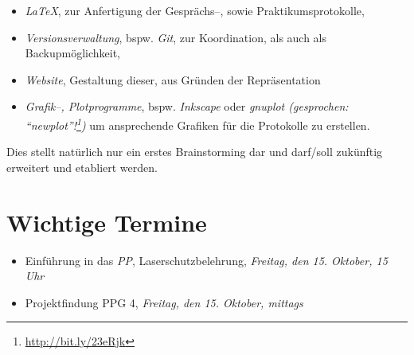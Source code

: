 \documentclass[%
fontsize=12pt,
paper=a4,
DIV=calc,
]{scrartcl}
\begin{document}
\begin{itemize}
	\item \emph{\LaTeX}, zur Anfertigung der Gesprächs--, sowie Praktikumsprotokolle,
	\item \emph{Versionsverwaltung}, bspw. \emph{Git}, zur Koordination, als auch als Backupmöglichkeit,
	\item \emph{Website}, Gestaltung dieser, aus Gründen der Repräsentation
	\item \emph{Grafik--, Plotprogramme}, bspw. \emph{Inkscape} oder \emph{gnuplot (gesprochen: \enquote{newplot}!\footnote{\url{http://bit.ly/23eRjk}})} um ansprechende Grafiken für die Protokolle zu erstellen.
\end{itemize}
Dies stellt natürlich nur ein erstes Brainstorming dar und darf/soll zukünftig erweitert und etabliert werden.

\section{Wichtige Termine}
\begin{itemize}
	\item Einführung in das \emph{PP}, Laserschutzbelehrung, \emph{Freitag, den 15. Oktober, 15 Uhr}
	\item Projektfindung PPG 4, \emph{Freitag, den 15. Oktober, mittags}
\end{itemize}
\end{document}
